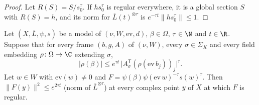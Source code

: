 \begin{proof}
Let $R(S)=S/s_0^\tau$. If $hs_0^\tau$ is regular everywhere, it is a global section $S$ with $R(S)=h$,
and its norm for $\overline L(t)^{\otimes\tau}$ is $e^{-\tau t}\|hs_0^\tau\|\le1$.
\end{proof}

\begin{lemma}\label{pf:covol:lem:dense}
Let $(X,\overline L,\psi,s)$ be a model of $(\nu,W,\mathrm{ev},d)$, $\beta\in\Omega$, $\tau\in\N$ and
$t\in\R$. Suppose that for every frame $(b,g,A)$ of $(\nu,W)$, every $\sigma\in\Sigma_K$ and every field
embedding $\rho\colon\Omega\to\C$ extending $\sigma$,
\begin{equation}\label{pf:covol:eq:genbound}
|\rho(\beta)|\le e^{\tau t}\,\bigl|A_\sigma^{\mathsf T}(\rho(\mathrm{ev}\,b_j))_j\bigr|^{\tau}.
\end{equation}
Let $w\in W$ with $\mathrm{ev}(w)\ne0$ and $F=\psi(\beta)\psi(\mathrm{ev}\,w)^{-\tau}s(w)^\tau$. Then
$\|F(y)\|^2\le e^{2\tau t}$ (norm of $\overline L^{\otimes\tau}$) at every complex point $y$ of $X$ at which
$F$ is regular.
%
\end{lemma}

